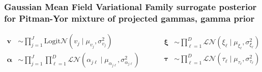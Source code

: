 \subsubsection{Gaussian Mean Field Variational Family surrogate posterior for Pitman-Yor mixture of projected gammas, gamma prior}
\begin{equation}
    \begin{aligned}
    \bm{v} &\sim {\textstyle\prod}_{j = 1}^J\text{Logit}\mathcal{N}(v_j\mid\mu_{v_j},\sigma^2_{v_j})\\
    \bm{\alpha} &\sim {\textstyle\prod}_{j = 1}^J{\textstyle\prod}_{\ell = 1}^D\mathcal{LN}(\alpha_{j\ell}\mid\mu_{\alpha_{j\ell}},\sigma^2_{\alpha_{j\ell}})
    \end{aligned}
    ~\hspace{1cm}
    \begin{aligned}
    \bm{\xi} &\sim{\textstyle\prod}_{\ell = 1}^D\mathcal{LN}(\xi_{\ell}\mid\mu_{\xi_{\ell}},\sigma^2_{\xi_{\ell}})\\
    \bm{\tau} &\sim{\textstyle\prod}_{\ell = 1}^D\mathcal{LN}(\tau_{\ell}\mid\mu_{\tau_{\ell}}, \sigma^2_{\tau_{\ell}})
    \end{aligned}
\end{equation}

